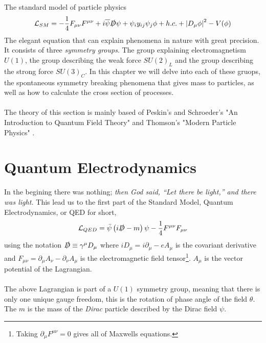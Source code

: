 \documentclass[12pt, a4paper]{book}
\begin{document}
The standard model of particle physics
\begin{equation}
    \mathcal{L}_{SM} = -\frac{1}{4}F_{\mu\nu}F^{\mu\nu} + i\overline{\psi}\slashed{D}\psi + \psi_iy_{ij}\psi_j\phi + h.c. + \abs{D_\mu\phi}^2 - V(\phi)
\end{equation}
The elegant equation that can explain phenomena in nature with great precision. It consists of three \textit{symmetry groups}. The group explaining electromagnetism $U(1)$, the group describing the weak force $SU(2)_L$ and the group describing the strong force $SU(3)_C$. 
In this chapter we will delve into each of these gruops, the spontaneous symmetry breaking phenomena that gives mass to particles, as well as how to calculate the cross section of processes.\\
\\The theory of this section is mainly based of Peskin's and Schroeder's "An Introduction to Quantum Field Theory" \cite{Peskin:1995ev} and Thomson's "Modern Particle Physics" \cite{THOMSON}.

\clearpage
\section{Quantum Electrodynamics}
In the begining there was nothing; \textit{then God said, “Let there be light,” and there was light.} This lead us to the first part of the Standard Model, Quantum Electrodynamics, or QED for short,
\begin{equation}\label{eq:QED}
    \mathcal{L}_{QED} = \bar{\psi}\left(i\slashed{D} -m\right)\psi -\frac{1}{4}F^{\mu\nu}F_{\mu\nu}
\end{equation}
using the notation $\slashed{D}\equiv \gamma^\mu D_\mu$ where $iD_\mu = i\partial_\mu -eA_\mu$ is the covariant derivative and $F_{\mu\nu}=\partial_\mu A_\nu - \partial_\nu A_\mu$ is the electromagnetic field tensor\footnote{Taking $\partial_\mu F^{\mu\nu} = 0$ gives all of Maxwells equations.}. $A_\mu$ is the vector potential of the Lagrangian.\\ 
\\The above Lagrangian is part of a $U(1)$ symmetry group, meaning that there is only one unique gauge freedom, this is the rotation of phase angle of the field $\theta$. The $m$ is the mass of the \textit{Dirac} particle described by the Dirac field $\psi$.
\end{document}
